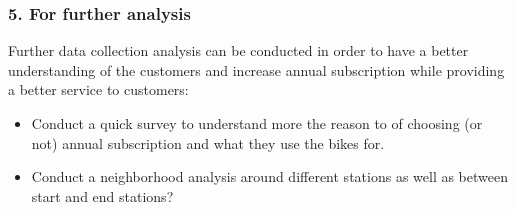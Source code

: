 \documentclass[
]{article}
\providecommand{\tightlist}{%
  \setlength{\itemsep}{0pt}\setlength{\parskip}{0pt}}
\begin{document}
\hypertarget{for-further-analysis}{%
\subsubsection{5. For further analysis}\label{for-further-analysis}}

Further data collection analysis can be conducted in order to have a
better understanding of the customers and increase annual subscription
while providing a better service to customers:

\begin{itemize}
\tightlist
\item
  Conduct a quick survey to understand more the reason to of choosing
  (or not) annual subscription and what they use the bikes for.
\item
  Conduct a neighborhood analysis around different stations as well as
  between start and end stations?
\end{itemize}
\end{document}
